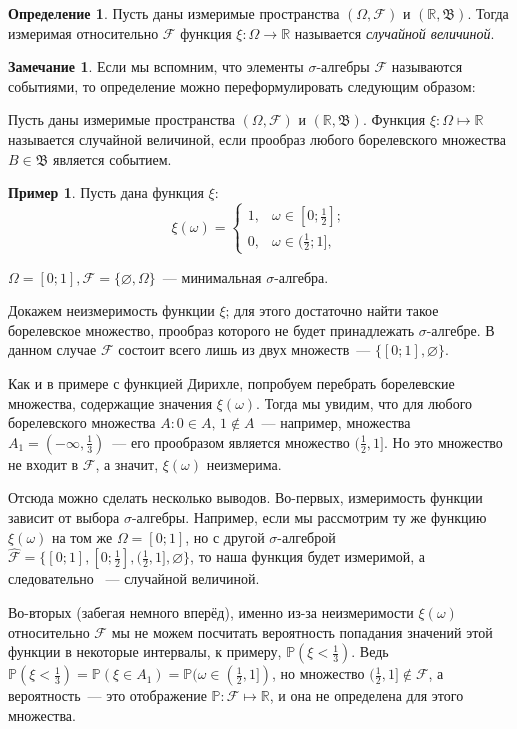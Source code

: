 \documentclass[oneside,final,14pt]{extreport}
\newcommand\myprob[1]{{\mathbb{P}(#1)}}
\theoremstyle{plain}
\theoremstyle{definition}
\newtheorem*{defn}{Определение}
\newtheorem*{exmp}{Пример}
\newtheorem*{rmrk}{Замечание}
\theoremstyle{named}
\begin{document}
\begin{defn}
    Пусть даны измеримые пространства $(\Omega, \mathcal{F})$ и $(\mathbb{R}, \mathfrak{B})$. Тогда измеримая относительно $\mathcal{F}$ функция $\xi: \Omega \to \mathbb{R}$ называется {\it случайной величиной}.
\end{defn}
\begin{rmrk}
    Если мы вспомним, что элементы $\sigma$-алгебры $\mathcal{F}$ называются событиями, то определение можно переформулировать следующим образом: 
    
    Пусть даны измеримые пространства $(\Omega, \mathcal{F})$ и $(\mathbb{R}, \mathfrak{B})$. Функция $\xi \colon \Omega \mapsto \mathbb{R}$ называется случайной величиной, если прообраз любого борелевского множества $B \in \mathfrak{B}$ является событием.
\end{rmrk}
\begin{exmp} Пусть дана функция $\xi$:
\begin{equation*}
    \xi(\omega) = 
    \begin{cases}
        1, & \omega \in \left[0; \frac{1}{2} \right]; \\
        0, & \omega \in (\frac{1}{2}; 1],
    \end{cases}
\end{equation*}

$\Omega = [0; 1], \mathcal{F} = \{\varnothing, \Omega\}$~--- минимальная ${\sigma \text{-алгебра}}$.  

Докажем неизмеримость функции $\xi$; для этого достаточно найти такое борелевское множество, прообраз которого не будет принадлежать ${\sigma \text{-алгебре}}$. В данном случае $\mathcal{F}$ состоит всего лишь из двух множеств~--- $\{[0; 1], \varnothing\}$.

Как и в примере с функцией Дирихле, попробуем перебрать борелевские множества, содержащие значения $\xi(\omega)$. Тогда мы увидим, что для любого борелевского множества $A \colon 0 \in A, \, 1 \notin A$~--- например, множества ${A_1 = (-\infty, \frac{1}{3})}$~--- его прообразом является множество $(\frac{1}{2}, 1]$. Но это множество не входит в $\mathcal{F}$, а значит, $\xi(\omega)$ неизмерима.

Отсюда можно сделать несколько выводов. Во-первых, измеримость функции зависит от выбора ${\sigma \text{-алгебры}}$. Например, если мы рассмотрим ту же функцию $\xi(\omega)$ на том же $\Omega = [0; 1]$, но с другой ${\sigma \text{-алгеброй}}$ ${\widehat{\mathcal{F}} = \{[0; 1], [0; \frac{1}{2}], (\frac{1}{2}, 1], \varnothing\}}$, то наша функция будет измеримой, а следовательно ~--- случайной величиной.

Во-вторых (забегая немного вперёд), именно из-за неизмеримости $\xi(\omega)$ относительно $\mathcal{F}$ мы не можем посчитать вероятность попадания значений этой функции в некоторые интервалы, к примеру, $\myprob{\xi < \frac{1}{3}}$. Ведь $\myprob{\xi < \frac{1}{3}} = \myprob{\xi \in A_1} = \myprob{\omega \in (\frac{1}{2}, 1]}$, но множество $(\frac{1}{2}, 1] \notin \mathcal{F}$, а вероятность~--- это отображение $\mathbb{P}: \mathcal{F} \mapsto \mathbb{R}$, и она не определена для этого множества.
\end{exmp} 
\end{document}
